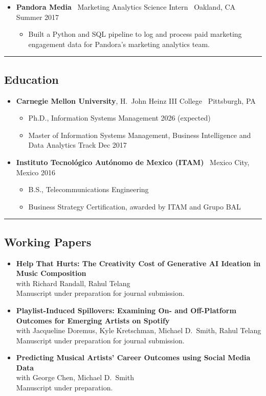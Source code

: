 \documentclass[10pt,letterpaper]{article}
\newcommand{\sep}{{\color{gray}\,\textbullet\,\,}}
\newcommand{\hsep}{\noindent\textcolor{gray}{\rule{\textwidth}{0.5pt}}}
\newcommand{\block}[1]{\begin{samepage}\hsep\subsection*{#1}\end{samepage}}
\begin{document}
\begin{itemize}[leftmargin=0pt, label={}]
\begin{itemize}
  \item Maintained KPI tracking, dashboards, and MAU reporting and forecasting workflows; used Hive and Airflow to support recurring targeting datasets and Tableau to monitor campaign performance.
  \end{itemize}
\item \textbf{Pandora Media} \sep Marketing Analytics Science Intern \sep Oakland, CA \hfill Summer 2017
  \begin{itemize}
  \item Built a Python and SQL pipeline to log and process paid marketing engagement data for Pandora's marketing analytics team.
  \end{itemize}
\end{itemize}

\block{Education}

\begin{itemize}[leftmargin=0pt, label={}]
\item \textbf{Carnegie Mellon University}, H.\ John Heinz III College \sep Pittsburgh, PA
  \begin{itemize}[label={}]
  \item Ph.D., Information Systems Management \hfill 2026 (expected)
  \item Master of Information Systems Management, Business Intelligence and Data Analytics Track \hfill Dec 2017
  \end{itemize}
\item \textbf{Instituto Tecnol\'ogico Aut\'onomo de Mexico (ITAM)} \sep Mexico City, Mexico \hfill 2016
  \begin{itemize}[label={}]
  \item B.S., Telecommunications Engineering
  \item Business Strategy Certification, awarded by ITAM and Grupo BAL
  \end{itemize}
\end{itemize}

\block{Working Papers}

\begin{itemize}[leftmargin=0pt, label={}]
\item \textbf{Help That Hurts: The Creativity Cost of Generative AI Ideation in Music Composition} \\
with Richard Randall, Rahul Telang \\
Manuscript under preparation for journal submission.
\item \textbf{Playlist-Induced Spillovers: Examining On- and Off-Platform Outcomes for Emerging Artists on Spotify} \\
with Jacqueline Doremus, Kyle Kretschman, Michael D.\ Smith, Rahul Telang \\
Manuscript under preparation for journal submission.
\item \textbf{Predicting Musical Artists' Career Outcomes using Social Media Data} \\
with George Chen, Michael D.\ Smith \\
Manuscript under preparation.
\end{itemize}
\end{document}
